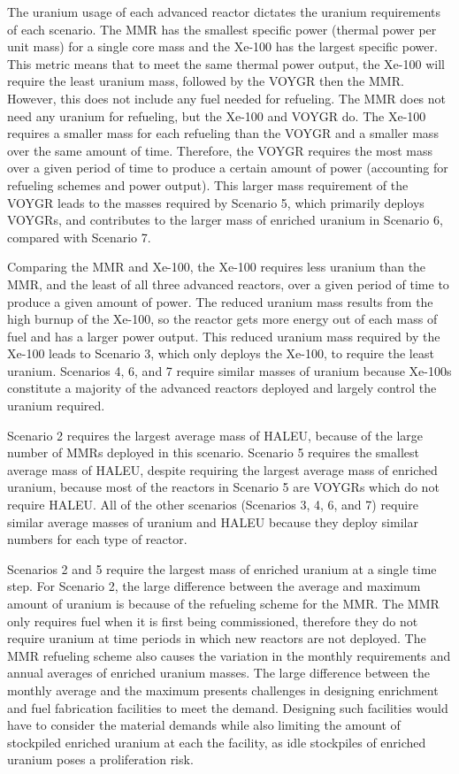 The uranium usage of each advanced reactor dictates the uranium requirements 
of each scenario. The \gls{MMR} has the smallest specific power (thermal 
power per unit mass) for a single core mass and the Xe-100 has the largest 
specific power. This metric means that to meet the same thermal power 
output, the Xe-100 will require the least uranium mass, followed by the 
VOYGR then the \gls{MMR}. However, this does not include any fuel needed for 
refueling. The \gls{MMR} does not need any uranium for refueling, but the 
Xe-100 and VOYGR do. The Xe-100 requires a smaller mass for each refueling 
than the VOYGR and a smaller mass over the same amount of time. Therefore, 
the VOYGR requires the most mass over a given period of time to produce 
a certain amount of power (accounting for refueling schemes and power  
output). This larger mass requirement of the VOYGR leads to the 
masses required by Scenario 5, which primarily deploys VOYGRs, and
contributes to the larger mass of enriched uranium in Scenario 6, compared 
with Scenario 7.

Comparing the \gls{MMR} and Xe-100, the Xe-100 requires less uranium than 
the \gls{MMR},
and the least of all three advanced reactors, over a given period of time 
to produce a given amount of power. The reduced uranium mass results 
from the high burnup of the Xe-100, so the reactor gets more energy out of 
each mass of fuel and has a larger power output. This reduced uranium mass 
required by the Xe-100 leads to Scenario 3, which only deploys the 
Xe-100, to require the least uranium. Scenarios 4, 6, and 7 require similar 
masses of uranium because Xe-100s constitute a majority of the advanced 
reactors deployed and largely control the uranium required. 

Scenario 2 requires the largest average mass of \gls{HALEU}, because 
of the large number of \glspl{MMR} deployed in this scenario. Scenario 
5 requires the smallest average mass of \gls{HALEU}, despite requiring the 
largest average mass of enriched uranium, because most of the 
reactors in Scenario 5 are VOYGRs which do not require \gls{HALEU}. 
All of the other scenarios (Scenarios 3, 4, 6, and 7) require similar 
average masses of uranium and \gls{HALEU} because they deploy similar 
numbers for each type of reactor. 

Scenarios 2 and 5 require the largest mass of enriched uranium at a single 
time step. For Scenario 2, the large difference between the average and 
maximum amount of uranium is because of the refueling scheme for the 
\gls{MMR}. The \gls{MMR} only requires fuel when it is first being 
commissioned, therefore they do not require uranium at time periods in 
which
new reactors are not deployed. The \gls{MMR} refueling scheme also 
causes the variation in the monthly requirements and annual averages of 
enriched uranium masses. The large difference between the 
monthly average and the maximum presents challenges in designing enrichment 
and fuel fabrication facilities 
to meet the demand. Designing such facilities would have to consider the 
material demands while also limiting the amount of stockpiled enriched 
uranium at each the facility, as idle stockpiles of enriched uranium 
poses a proliferation risk. 

